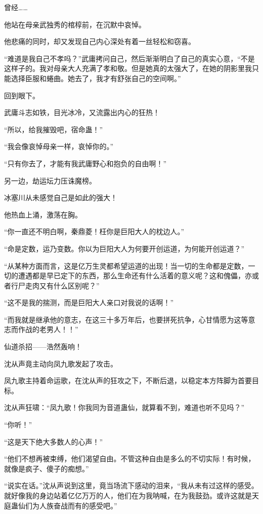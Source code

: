 \begin{this_body}
曾经……

他站在母亲武独秀的棺椁前，在沉默中哀悼。

他悲痛的同时，却又发现自己内心深处有着一丝轻松和窃喜。

“难道是我自己不孝吗？”武庸拷问自己，然后渐渐明白了自己的真实心意，“不是这样子的。我对母亲大人充满了孝和敬。但是她真的太强大了，在她的阴影里我只能选择臣服和蜷曲。她去了，我才有舒张自己的空间啊。”

回到眼下。

武庸斗志如铁，目光冰冷，又流露出内心的狂热！

“所以，给我摧毁吧，宿命蛊！”

“我会像哀悼母亲一样，哀悼你的。”

“只有你去了，才能有我武庸野心和抱负的自由啊！”

另一边，劫运坛力压诛魔榜。

冰塞川从未感觉自己是如此的强大！

他热血上涌，激荡在胸。

“你一直还不明白啊，秦鼎菱！枉你是巨阳大人的枕边人。”

“命是定数，运乃变数。你以为巨阳大人为何要开创运道，为何能开创运道？”

“从某种方面而言，这是亿万生灵都希望运道的出现！当一切的生命都是定数，一切的遭遇都是早已定下的东西，那么生命还有什么活着的意义呢？这和傀儡，亦或者行尸走肉又有什么区别呢？”

“这不是我的揣测，而是巨阳大人亲口对我说的话啊！”

“而我就是继承他的意志，在这三十多万年后，也要拼死抗争，心甘情愿为这等意志而作战的老男人！！”

仙道杀招——浩然轰响！

沈从声竟主动向凤九歌发起了攻击。

凤九歌主持着命运歌，在沈从声的狂攻之下，不断后退，以稳定本方阵脚为首要目标。

沈从声狂啸：“凤九歌！你我同为音道蛊仙，就算看不到，难道也听不见吗？”

“你听！”

“这是天下绝大多数人的心声！”

“他们不想再被束缚，他们渴望自由。不管这种自由是多么的不切实际！有时候，就像是疯子、傻子的痴想。”

“说实在话。”沈从声说到这里，竟当场流下感动的泪来，“我从未有过这样的感受。就好像我的身边站着亿亿万万的人，他们在为我呐喊，在为我鼓劲。或许这就是天庭蛊仙们为人族奋战而有的感受吧。”


\end{this_body}

